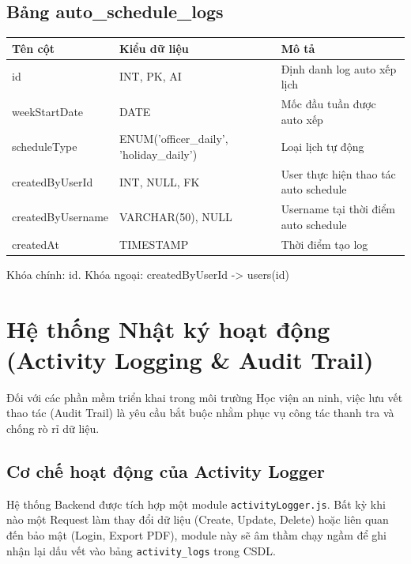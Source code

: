 \documentclass[18pt,a4paper]{report}
\begin{document}
\subsection{Bảng auto\_schedule\_logs}
\begin{longtable}{|>{\raggedright\arraybackslash}p{4.5cm}|>{\raggedright\arraybackslash}p{4.5cm}|>{\raggedright\arraybackslash}p{6.5cm}|}
\hline
\textbf{Tên cột} & \textbf{Kiểu dữ liệu} & \textbf{Mô tả} \\ \hline
id & INT, PK, AI & Định danh log auto xếp lịch \\ \hline
weekStartDate & DATE & Mốc đầu tuần được auto xếp \\ \hline
scheduleType & ENUM('officer\_daily', 'holiday\_daily') & Loại lịch tự động \\ \hline
createdByUserId & INT, NULL, FK & User thực hiện thao tác auto schedule \\ \hline
createdByUsername & VARCHAR(50), NULL & Username tại thời điểm auto schedule \\ \hline
createdAt & TIMESTAMP & Thời điểm tạo log \\ \hline
\end{longtable}
Khóa chính: id. Khóa ngoại: createdByUserId -> users(id)

\section{Hệ thống Nhật ký hoạt động (Activity Logging \& Audit Trail)}

Đối với các phần mềm triển khai trong môi trường Học viện an ninh, việc lưu vết thao tác (Audit Trail) là yêu cầu bắt buộc nhằm phục vụ công tác thanh tra và chống rò rỉ dữ liệu.

\subsection{Cơ chế hoạt động của Activity Logger}
Hệ thống Backend được tích hợp một module \texttt{activityLogger.js}. Bất kỳ khi nào một Request làm thay đổi dữ liệu (Create, Update, Delete) hoặc liên quan đến bảo mật (Login, Export PDF), module này sẽ âm thầm chạy ngầm để ghi nhận lại dấu vết vào bảng \texttt{activity\_logs} trong CSDL.
\end{document}
